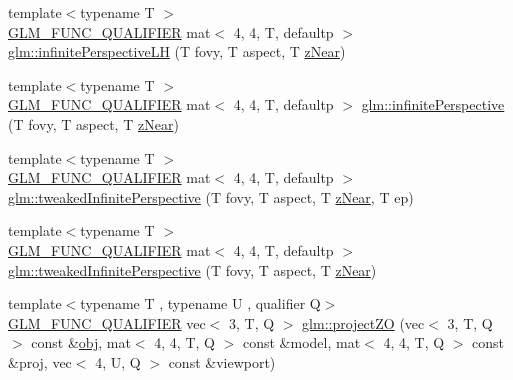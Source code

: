 \begin{DoxyCompactItemize}
\item 
{\footnotesize template$<$typename T $>$ }\\\mbox{\hyperlink{setup_8hpp_a33fdea6f91c5f834105f7415e2a64407}{G\+L\+M\+\_\+\+F\+U\+N\+C\+\_\+\+Q\+U\+A\+L\+I\+F\+I\+ER}} mat$<$ 4, 4, T, defaultp $>$ \mbox{\hyperlink{group__gtc__matrix__transform_ga3201b30f5b3ea0f933246d87bfb992a9}{glm\+::infinite\+Perspective\+LH}} (T fovy, T aspect, T \mbox{\hyperlink{_s_d_l__opengl__glext_8h_a12d99226e590bbaaf0be69169eeb4834}{z\+Near}})
\item 
{\footnotesize template$<$typename T $>$ }\\\mbox{\hyperlink{setup_8hpp_a33fdea6f91c5f834105f7415e2a64407}{G\+L\+M\+\_\+\+F\+U\+N\+C\+\_\+\+Q\+U\+A\+L\+I\+F\+I\+ER}} mat$<$ 4, 4, T, defaultp $>$ \mbox{\hyperlink{group__gtc__matrix__transform_ga44fa38a18349450325cae2661bb115ca}{glm\+::infinite\+Perspective}} (T fovy, T aspect, T \mbox{\hyperlink{_s_d_l__opengl__glext_8h_a12d99226e590bbaaf0be69169eeb4834}{z\+Near}})
\item 
{\footnotesize template$<$typename T $>$ }\\\mbox{\hyperlink{setup_8hpp_a33fdea6f91c5f834105f7415e2a64407}{G\+L\+M\+\_\+\+F\+U\+N\+C\+\_\+\+Q\+U\+A\+L\+I\+F\+I\+ER}} mat$<$ 4, 4, T, defaultp $>$ \mbox{\hyperlink{group__gtc__matrix__transform_gaf5b3c85ff6737030a1d2214474ffa7a8}{glm\+::tweaked\+Infinite\+Perspective}} (T fovy, T aspect, T \mbox{\hyperlink{_s_d_l__opengl__glext_8h_a12d99226e590bbaaf0be69169eeb4834}{z\+Near}}, T ep)
\item 
{\footnotesize template$<$typename T $>$ }\\\mbox{\hyperlink{setup_8hpp_a33fdea6f91c5f834105f7415e2a64407}{G\+L\+M\+\_\+\+F\+U\+N\+C\+\_\+\+Q\+U\+A\+L\+I\+F\+I\+ER}} mat$<$ 4, 4, T, defaultp $>$ \mbox{\hyperlink{group__gtc__matrix__transform_gaaeacc04a2a6f4b18c5899d37e7bb3ef9}{glm\+::tweaked\+Infinite\+Perspective}} (T fovy, T aspect, T \mbox{\hyperlink{_s_d_l__opengl__glext_8h_a12d99226e590bbaaf0be69169eeb4834}{z\+Near}})
\item 
{\footnotesize template$<$typename T , typename U , qualifier Q$>$ }\\\mbox{\hyperlink{setup_8hpp_a33fdea6f91c5f834105f7415e2a64407}{G\+L\+M\+\_\+\+F\+U\+N\+C\+\_\+\+Q\+U\+A\+L\+I\+F\+I\+ER}} vec$<$ 3, T, Q $>$ \mbox{\hyperlink{group__gtc__matrix__transform_ga77d157525063dec83a557186873ee080}{glm\+::project\+ZO}} (vec$<$ 3, T, Q $>$ const \&\mbox{\hyperlink{_s_d_l__opengl__glext_8h_a0c0d4701a6c89f4f7f0640715d27ab26}{obj}}, mat$<$ 4, 4, T, Q $>$ const \&model, mat$<$ 4, 4, T, Q $>$ const \&proj, vec$<$ 4, U, Q $>$ const \&viewport)

\end{DoxyCompactItemize}
